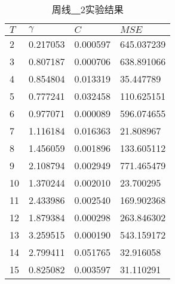 \begin{table}[ht]
    \centering
    \caption{周线\underline{~~}2实验结果}
    \begin{tabular}{llll}
        \hline
        $T$&  $\gamma$ &         $C$ &     $MSE$ \\
        \hline
         2 &  0.217053 &  0.000597 &  645.037239 \\
         3 &  0.807187 &  0.000706 &  638.891066 \\
         4 &  0.854804 &  0.013319 &   35.447789 \\
         5 &  0.777241 &  0.032458 &  110.625151 \\
         6 &  0.977071 &  0.000089 &  596.074655 \\
         7 &  1.116184 &  0.016363 &   21.808967 \\
         8 &  1.456059 &  0.001896 &  133.605112 \\
         9 &  2.108794 &  0.002949 &  771.465479 \\
        10 &  1.370244 &  0.002010 &   23.700295 \\
        11 &  2.433986 &  0.002540 &  169.902368 \\
        12 &  1.879384 &  0.000298 &  263.846302 \\
        13 &  3.259515 &  0.000190 &  543.159172 \\
        14 &  2.799411 &  0.051765 &   32.916058 \\
        15 &  0.825082 &  0.003597 &   31.110291 \\
        \hline
    \end{tabular}
\end{table}